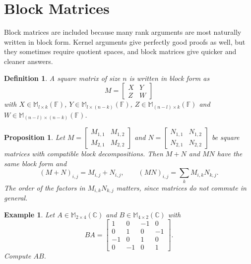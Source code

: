 \documentclass[12pt]{article}
\theoremstyle{breakplain}
\newtheorem{prop}[theorem]{Proposition}
\theoremstyle{breakdef}
\newtheorem{definition}[theorem]{Definition}
\newtheorem*{example}{Example}
\theoremstyle{remark}
\begin{document}
\section{Block Matrices}
Block matrices are included because many rank arguments are most naturally written in block form. Kernel arguments give perfectly good proofs as well, but they sometimes require quotient spaces, and block matrices give quicker and cleaner answers.
\begin{definition}
    A square matrix of size $n$ is written in \emph{block form} as
    \[M=\begin{bmatrix}
        X&Y\\
        Z&W
    \end{bmatrix}\]
    with $X\in \mathbb{M}_{l\times k}(\mathbb{F})$, $Y\in \mathbb{M}_{l\times (n-k)}(\mathbb{F})$, $Z\in \mathbb{M}_{(n-l)\times k}(\mathbb{F})$ and $W\in \mathbb{M}_{(n-l)\times (n-k)}(\mathbb{F})$.
\end{definition}
\begin{prop}
    Let $M=\begin{bmatrix}
        M_{1,1}&M_{1,2}\\
        M_{2,1}&M_{2,2}
    \end{bmatrix}$ and $N=\begin{bmatrix}
        N_{1,1}&N_{1,2}\\
        N_{2,1}&N_{2,2}
    \end{bmatrix}$ be square matrices with compatible block decompositions. Then $M+N$ and $MN$ have the same block form and
    \[(M+N)_{i,j}=M_{i,j}+N_{i,j},\qquad (MN)_{i,j}=\sum_k M_{i,k}N_{k,j}.\]
    The order of the factors in $M_{i,k}N_{k,j}$ matters, since matrices do not commute in general.
\end{prop}
\begin{example}
    Let $A\in \mathbb{M}_{2 \times 4}(\mathbb{C})$ and $B\in \mathbb{M}_{4 \times 2}(\mathbb{C})$ with
    \[BA=\begin{bmatrix}
        1 & 0 &-1 & 0\\
        0 & 1 & 0 & -1\\
        -1& 0 & 1 & 0 \\
        0 & -1 & 0 & 1
    \end{bmatrix}.\]
    Compute $AB$.
\end{example}
\end{document}

